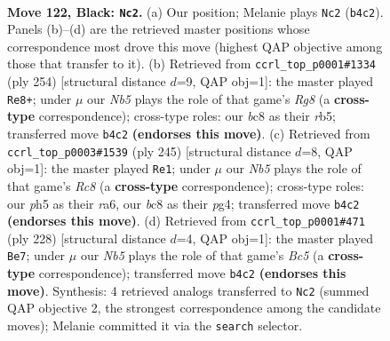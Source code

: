 \documentclass[11pt]{article}
\begin{document}
\clearpage

\begin{figure}[p]\centering
\begin{subfigure}{0.46\textwidth}\centering
\resizebox{\linewidth}{!}{%
\newchessgame
\chessboard[
  setfen={2B5/6k1/8/6PP/1n6/6K1/8/8 b - - 14 122},
  showmover=false,
  pgfstyle=straightmove, color=movearrow, markmove={b4-c2}
]}
\caption{}
\end{subfigure}\hfill
\begin{subfigure}{0.46\textwidth}\centering
\resizebox{\linewidth}{!}{%
\newchessgame
\chessboard[
  setfen={6R1/8/8/1r6/5p2/7p/4k2K/8 w - - 64 128},
  showmover=false,
  pgfstyle=straightmove, color=movearrow, markmove={g8-e8}
]}
\caption{}
\end{subfigure}
\\[4pt]
\begin{subfigure}{0.46\textwidth}\centering
\resizebox{\linewidth}{!}{%
\newchessgame
\chessboard[
  setfen={8/6k1/R7/6P1/6P1/8/6K1/2r5 b - - 20 123},
  showmover=false,
  pgfstyle=straightmove, color=movearrow, markmove={c1-e1}
]}
\caption{}
\end{subfigure}\hfill
\begin{subfigure}{0.46\textwidth}\centering
\resizebox{\linewidth}{!}{%
\newchessgame
\chessboard[
  setfen={8/8/6p1/2B5/4k1p1/2b5/6K1/8 w - - 62 115},
  showmover=false,
  pgfstyle=straightmove, color=movearrow, markmove={c5-e7}
]}
\caption{}
\end{subfigure}
\caption{\textbf{Move 122, Black: \texttt{Nc2}.} (a) Our position; Melanie plays \texttt{Nc2} (\texttt{b4c2}). Panels (b)--(d) are the retrieved master positions whose correspondence most drove this move (highest QAP objective among those that transfer to it). (b) Retrieved from \texttt{ccrl\_top\_p0001\#1334} (ply 254) [structural distance $d$=9, QAP obj=1]: the master played \texttt{Re8+}; under $\mu$ our \emph{Nb5} plays the role of that game's \emph{Rg8} (a \textbf{cross-type} correspondence); cross-type roles: our \emph{b}c8 as their \emph{r}b5; transferred move \texttt{b4c2} \textbf{(endorses this move)}. (c) Retrieved from \texttt{ccrl\_top\_p0003\#1539} (ply 245) [structural distance $d$=8, QAP obj=1]: the master played \texttt{Re1}; under $\mu$ our \emph{Nb5} plays the role of that game's \emph{Rc8} (a \textbf{cross-type} correspondence); cross-type roles: our \emph{p}h5 as their \emph{r}a6, our \emph{b}c8 as their \emph{p}g4; transferred move \texttt{b4c2} \textbf{(endorses this move)}. (d) Retrieved from \texttt{ccrl\_top\_p0001\#471} (ply 228) [structural distance $d$=4, QAP obj=1]: the master played \texttt{Be7}; under $\mu$ our \emph{Nb5} plays the role of that game's \emph{Bc5} (a \textbf{cross-type} correspondence); transferred move \texttt{b4c2} \textbf{(endorses this move)}. Synthesis: 4 retrieved analogs transferred to \texttt{Nc2} (summed QAP objective 2, the strongest correspondence among the candidate moves); Melanie committed it via the \texttt{search} selector.}
\label{fig:thought-m243}
\end{figure}
\end{document}
